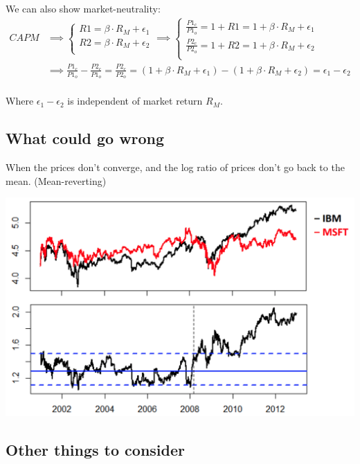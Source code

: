 \documentclass[
  oneside]{book}
\begin{document}
We can also show market-neutrality:
\[
\begin{aligned}
CAPM &\implies \begin{cases}
R1 = \beta\cdot R_{M} + \epsilon_{1} \\
R2 = \beta\cdot R_{M} + \epsilon_{2} \\
\end{cases} \implies
\begin{cases}
\frac{P1_{c}}{P1_{o}} = 1+R1 = 1+\beta\cdot R_{M} + \epsilon_{1} \\
\frac{P2_{c}}{P2_{o}} = 1+R2 = 1+\beta\cdot R_{M} + \epsilon_{2} \\
\end{cases}\\
&\implies \frac{P1_{c}}{P1_{o}} - \frac{P2_{c}}{P1_{o}} = \frac{P2_{c}}{P2_{o}} = (1+\beta\cdot R_{M} + \epsilon_{1}) - (1+\beta\cdot R_{M} + \epsilon_{2}) = \epsilon_{1}-\epsilon_{2}\\
\end{aligned}
\]

Where \(\epsilon_{1}-\epsilon_{2}\) is independent of market return \(R_{M}\).

\hypertarget{what-could-go-wrong}{%
\subsection{What could go wrong}\label{what-could-go-wrong}}

When the prices don't converge, and the log ratio of prices don't go back to the mean. (Mean-reverting)

\includegraphics{Notes/Obsidian-Attachments/9-Statistical-Arbitrage-4.png}

\hypertarget{other-things-to-consider}{%
\subsection{Other things to consider}\label{other-things-to-consider}}
\end{document}
